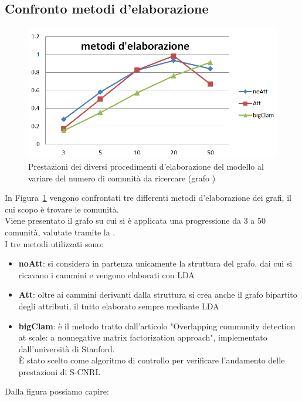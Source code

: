 \subsection{Confronto metodi d'elaborazione}%
%
\begin{figure}[htp]
	\centering
	\includegraphics[width=\linewidth]{immagini/MOD_3_elaborazione}
	\caption{Prestazioni dei diversi procedimenti d'elaborazione del modello al variare del numero di comunità da ricercare (grafo \cora)}
	\label{fig:MOD_3_elaborazione}
\end{figure}
%
In Figura~\ref{fig:MOD_3_elaborazione} vengono confrontati tre differenti metodi d'elaborazione dei grafi, il cui scopo è trovare le comunità.\\
Viene presentato il grafo \cora su cui si è applicata una progressione da $3$ a $50$ comunità, valutate tramite la \mmod. \\
I tre metodi utilizzati sono:
\begin{itemize}
	\item \textbf{noAtt}: si considera in partenza unicamente la struttura del grafo, dai cui si ricavano i cammini e vengono elaborati con LDA
	\item \textbf{Att}: oltre ai cammini derivanti dalla struttura si crea anche il grafo bipartito degli attributi, il tutto elaborato sempre mediante LDA
	\item \textbf{bigClam}: è il metodo tratto dall'articolo "Overlapping community detection at scale: a nonnegative matrix factorization approach"\cite{bigClam_paper}, implementato dall'università di Stanford\cite{bigClam_code}.\\
	È stato scelto come algoritmo di controllo per verificare l'andamento delle prestazioni di S-CNRL
\end{itemize}
Dalla figura possiamo capire:
